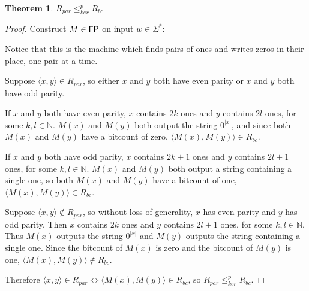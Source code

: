 \documentclass{article}
\newtheorem{theorem}{Theorem}[section]
\theoremstyle{definition} \newtheorem{definition}[definition]{Definition}
\newcommand{\sigmastar}{\Sigma^{*}} %
\newcommand{\kr}{\leq^{p}_{ker}} %
\newcommand{\pair}[2]{\langle#1,#2\rangle} %
\begin{document}
\begin{theorem}$R_{par}\kr R_{bc}$\end{theorem}
\begin{proof}
  Construct $M\in {\ensuremath{\mathsf{FP}}}$ on input $w\in\sigmastar$:\\
  \begin{algorithm}[H]
  \end{algorithm}
  Notice that this is the machine which finds pairs of ones and writes zeros in
  their place, one pair at a time.

  Suppose $\pair{x}{y}\in R_{par}$, so either $x$ and $y$ both have even parity
  or $x$ and $y$ both have odd parity.
  
  If $x$ and $y$ both have even parity, $x$ contains $2k$ ones and $y$ contains
  $2l$ ones, for some $k,l\in\mathbb{N}$. $M(x)$ and $M(y)$ both output the
  string $0^{|x|}$, and since both $M(x)$ and $M(y)$ have a bitcount of zero,
  $\pair{M(x)}{M(y)}\in R_{bc}$.

  If $x$ and $y$ both have odd parity, $x$ contains $2k+1$ ones and $y$
  contains $2l+1$ ones, for some $k,l\in\mathbb{N}$. $M(x)$ and $M(y)$ both
  output a string containing a single one, so both $M(x)$ and $M(y)$ have a
  bitcount of one, $\pair{M(x)}{M(y)}\in R_{bc}$.

  Suppose $\pair{x}{y}\notin R_{par}$, so without loss of generality, $x$ has
  even parity and $y$ has odd parity. Then $x$ contains $2k$ ones and $y$
  contains $2l+1$ ones, for some $k,l\in\mathbb{N}$. Thus $M(x)$ outputs the
  string $0^{|x|}$ and $M(y)$ outputs the string containing a single one. Since
  the bitcount of $M(x)$ is zero and the bitcount of $M(y)$ is one,
  $\pair{M(x)}{M(y)}\notin R_{bc}$.

  Therefore $\pair{x}{y}\in R_{par} \iff \pair{M(x)}{M(y)}\in R_{bc}$, so
  $R_{par} \kr R_{bc}$.
\end{proof}
\end{document}
